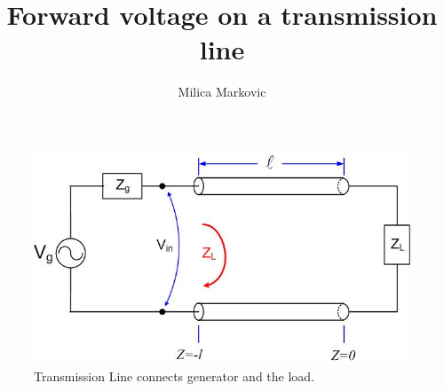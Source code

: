 \documentclass{ximera}
\title{Forward voltage on a transmission line}
\author{Milica Markovic}
\begin{document}
  
\begin{abstract}  

\end{abstract}  
\maketitle    






\begin{figure}[htbp]
\begin{center}
\includegraphics[scale=0.3]{../jpg/trline.jpg}
\end{center}
\caption{Transmission Line connects generator and the load.}
\label{fig:TRLine}
\end{figure}
\end{document}
